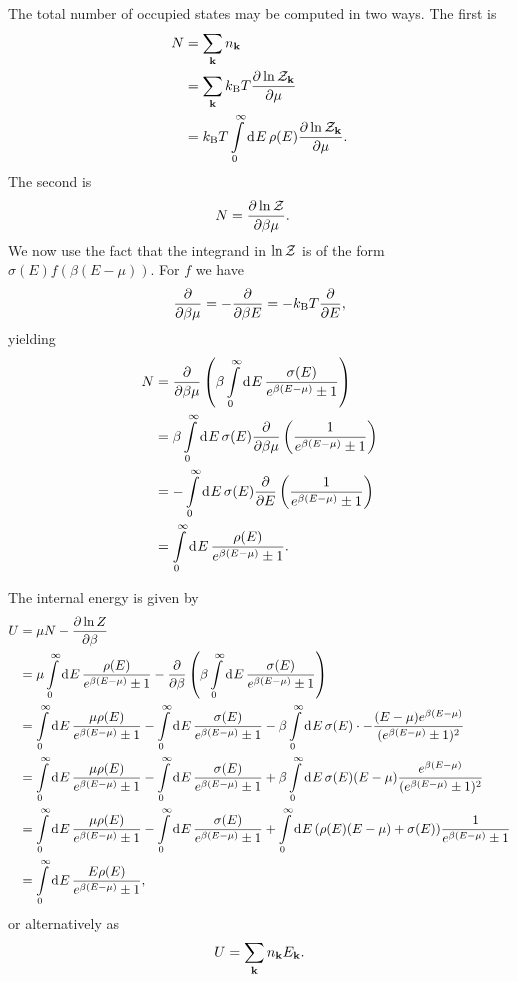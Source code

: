 The total number of occupied states may be computed in two ways. The first is
\begin{align*}
	N &= \sum\limits_{\vb{k}}n_{\vb{k}} \\
	  &= \sum\limits_{\vb{k}}k_{\text{B}} T\pdv{\ln{\mathcal{Z}_{\vb{k}}}}{\mu} \\
	  &= k_{\text{B}} T\int\limits_{0}^{\infty}\dd[]{E}\rho(E)\pdv{\ln{\mathcal{Z}_{\vb{k}}}}{\mu}.
\end{align*}
The second is
\begin{align*}
	N &= \pdv{\ln{\mathcal{Z}}}{\beta\mu}.
\end{align*}
We now use the fact that the integrand in $\ln{\mathcal{Z}}$ is of the form $\sigma(E)f(\beta(E - \mu))$. For $f$ we have
\begin{align*}
	\pdv{}{\beta\mu} = -\pdv{}{\beta E} = -k_{\text{B}} T\pdv{}{E},
\end{align*}
yielding
\begin{align*}
	N &= \pdv{\beta\mu}\left(\beta\int\limits_{0}^{\infty}\dd[]{E}\frac{\sigma(E)}{e^{\beta(E - \mu)} \pm 1}\right) \\
	  &= \beta\int\limits_{0}^{\infty}\dd[]{E}\sigma(E)\pdv{\beta\mu}\left(\frac{1}{e^{\beta(E - \mu)} \pm 1}\right) \\
	  &= -\int\limits_{0}^{\infty}\dd[]{E}\sigma(E)\pdv{E}\left(\frac{1}{e^{\beta(E - \mu)} \pm 1}\right) \\
	  &= \int\limits_{0}^{\infty}\dd[]{E}\frac{\rho(E)}{e^{\beta(E - \mu)} \pm 1}.
\end{align*}

The internal energy is given by
\begin{align*}
	U &= \mu N - \pdv{\ln{Z}}{\beta} \\
	  &= \mu\int\limits_{0}^{\infty}\dd[]{E}\frac{\rho(E)}{e^{\beta(E - \mu)} \pm 1} - \pdv{\beta}\left(\beta\int\limits_{0}^{\infty}\dd[]{E}\frac{\sigma(E)}{e^{\beta(E - \mu)} \pm 1}\right) \\
	  &= \int\limits_{0}^{\infty}\dd[]{E}\frac{\mu\rho(E)}{e^{\beta(E - \mu)} \pm 1} - \int\limits_{0}^{\infty}\dd[]{E}\frac{\sigma(E)}{e^{\beta(E - \mu)} \pm 1} - \beta\int\limits_{0}^{\infty}\dd[]{E}\sigma(E)\cdot -\frac{(E - \mu)e^{\beta(E - \mu)}}{(e^{\beta(E - \mu)} \pm 1)^{2}} \\
	  &= \int\limits_{0}^{\infty}\dd[]{E}\frac{\mu\rho(E)}{e^{\beta(E - \mu)} \pm 1} - \int\limits_{0}^{\infty}\dd[]{E}\frac{\sigma(E)}{e^{\beta(E - \mu)} \pm 1} + \beta\int\limits_{0}^{\infty}\dd[]{E}\sigma(E)(E - \mu)\frac{e^{\beta(E - \mu)}}{(e^{\beta(E - \mu)} \pm 1)^{2}} \\
	  &= \int\limits_{0}^{\infty}\dd[]{E}\frac{\mu\rho(E)}{e^{\beta(E - \mu)} \pm 1} - \int\limits_{0}^{\infty}\dd[]{E}\frac{\sigma(E)}{e^{\beta(E - \mu)} \pm 1} + \int\limits_{0}^{\infty}\dd[]{E}(\rho(E)(E - \mu) + \sigma(E))\frac{1}{e^{\beta(E - \mu)} \pm 1} \\
	  &= \int\limits_{0}^{\infty}\dd[]{E}\frac{E\rho(E)}{e^{\beta(E - \mu)} \pm 1},
\end{align*}
or alternatively as
\begin{align*}
	U = \sum\limits_{\vb{k}}n_{\vb{k}}E_{\vb{k}}.
\end{align*}

